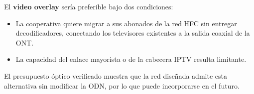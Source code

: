 El \textbf{video overlay} sería preferible bajo dos condiciones:
\begin{itemize}
    \item La cooperativa quiere migrar a sus abonados de la red HFC sin entregar decodificadores, conectando los televisores existentes a la salida coaxial de la ONT.
    \item La capacidad del enlace mayorista o de la cabecera IPTV resulta limitante.
\end{itemize}
El presupuesto óptico verificado muestra que la red diseñada admite esta alternativa sin modificar la ODN, por lo que puede incorporarse en el futuro.
